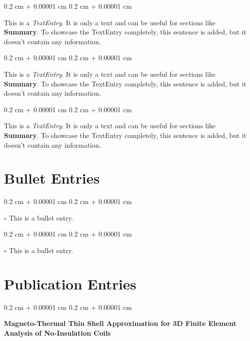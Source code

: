 \documentclass[10pt, letterpaper]{article}
\newenvironment{onecolentry}{
    \begin{adjustwidth}{
        0.2 cm + 0.00001 cm
    }{
        0.2 cm + 0.00001 cm
    }
}{
    \end{adjustwidth}
} %
\begin{document}
        
        \begin{onecolentry}
            This is a \textit{TextEntry}. It is only a text and can be useful for sections like \textbf{Summary}. To showcase the TextEntry completely, this sentence is added, but it doesn't contain any information.
        \end{onecolentry}

        \vspace{0.2 cm}

        \begin{onecolentry}
            This is a \textit{TextEntry}. It is only a text and can be useful for sections like \textbf{Summary}. To showcase the TextEntry completely, this sentence is added, but it doesn't contain any information.
        \end{onecolentry}

        \vspace{0.2 cm}

        \begin{onecolentry}
            This is a \textit{TextEntry}. It is only a text and can be useful for sections like \textbf{Summary}. To showcase the TextEntry completely, this sentence is added, but it doesn't contain any information.
        \end{onecolentry}


    
    \section{Bullet Entries}

        
        \begin{onecolentry}
            $\circ$ This is a bullet entry.
        \end{onecolentry}

        \vspace{0.2 cm}

        \begin{onecolentry}
            $\circ$ This is a bullet entry.
        \end{onecolentry}


    
    \section{Publication Entries}

        
        \begin{samepage}
            \begin{onecolentry}
                \textbf{Magneto-Thermal Thin Shell Approximation for 3D Finite Element Analysis of No-Insulation Coils}
            \end{onecolentry}


        \end{samepage}
\end{document}
